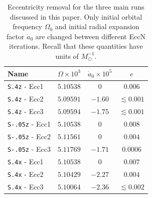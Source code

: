 {\begin{table}
\centering
\begin{tabular} {l | l | c | c}
Name & $\Omega\times10^{3}$ & $\dot{a}_0\times10^{5}$ & $e$
\\ \hline {\tt S.4z} - Ecc1 & $5.10538$ & $0$ & $0.006$ \\ {\tt S.4z} - Ecc2 &
$5.09591$ & $-1.60$ & $\lesssim 0.001$ \\ {\tt S.4z} - Ecc3 & $5.09594$ &
$-1.75$ & $\lesssim 0.001$ \\ \hline {\tt S-.05z} - Ecc1 & $5.10538$ & $0$ &
$0.008$ \\ {\tt S-.05z} - Ecc2 & $5.11561$ & $0$ & $0.004$ \\ {\tt S-.05z} - Ecc3
& $5.11769$ & $-1.71$ & $0.0006$ \\\hline {\tt S.4x} - Ecc1 & $5.10538$ &
$0$ & $0.007$ \\ {\tt S.4x} - Ecc2 & $5.10429$ & $-2.27$ & $0.004$ \\ {\tt S.4x} -
Ecc3 & $5.10064$ & $-2.36$ & $\lesssim 0.002$ \\
\end{tabular}
\caption[Eccentricity removal data for our three main runs.]{\label{tab:ecc_removal} Eccentricity removal for the three
  main runs discussed in this paper.  Only initial orbital frequency
  $\Omega_0$ and initial radial expansion factor $\dot a_0$ are
  changed between different EccN iterations. Recall that these
  quantities have units of $M_{\odot}^{-1}$.}
\end{table}

}
